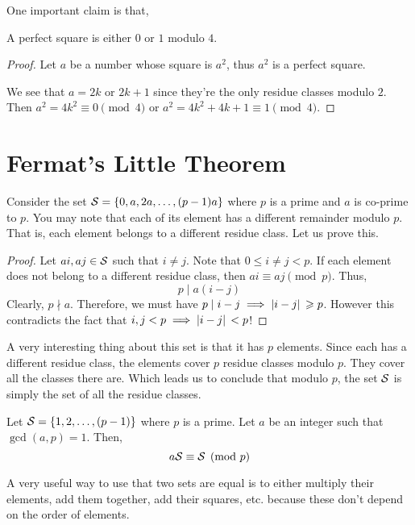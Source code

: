 One important claim is that, 

\begin{claim}
    A perfect square is either \(0\) or \(1\) modulo \(4\).
\end{claim}

\begin{proof}
    Let \(a\) be a number whose square is \(a^2\), thus \(a^2\) is a perfect 
    square.

    We see that \(a = 2k\) or \(2k + 1\) since they're the only residue classes 
    modulo \(2\). Then \(a^2 = 4k^2 \equiv 0 \pmod{4}\) or \(a^2 = 4k^2 + 4k + 1
    \equiv 1 \pmod{4}\).
\end{proof}

\section{Fermat's Little Theorem}

Consider the set \(\mathcal{S} = \left\{0, a, 2a, \dots, (p-1)a\right\}\) where \(p\)
is a prime and \(a\) is co-prime to \(p\). You may note
that each of its element has a different remainder modulo \(p\). That is,
each element belongs to a different residue class. Let us prove this.

\begin{proof}
    Let \(ai, aj \in \mathcal{S}\) such that \(i \neq j\). Note that 
    \(0 \le i \ne j < p\). 
    If each element does not belong to a different residue class, then 
    \(ai \equiv aj \pmod{p}\). Thus, 
    \[p \mid a(i-j)\]
    Clearly, \(p \nmid a\). Therefore, we must have \(p \mid i-j \implies 
    \abs*{i-j} \geqslant p\). However this contradicts the fact 
    that \(i, j < p \implies \abs*{i-j} < p\)!
\end{proof}

A very interesting thing about this set is that it has \(p\) elements.
Since each has a different residue class, the elements cover 
\(p\) residue classes modulo \(p\). They cover all the classes there are.
Which leads us to conclude that modulo \(p\), the set \(\mathcal{S}\) is simply 
the set of all the residue classes.

\begin{lemma}
    Let \(\mathcal{S} = \left\{1, 2, \dots, (p-1)\right\}\) where \(p\) is 
    a prime. Let \(a\) be an integer such that \(\gcd(a, p) = 1\). Then,
    \[ a\mathcal{S} \equiv \mathcal{S} \pmod{p} \]
\end{lemma}

A very useful way to use that two sets are equal is to either 
multiply their elements, add them together, add their squares, etc.
because these don't depend on the order of elements.

